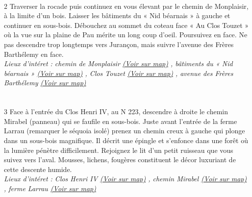 \documentclass{article}
\begin{document}
        \paragraph{}
        2
                        Traverser la rocade puis continuez en vous élevant par le chemin de Monplaisir, à la limite d'un bois. Laisser les bâtiments du « Nid béarnais » à gauche et continuer en sous-bois. Débouchez au sommet du coteau face « Au Clos Touzet » où la vue sur la plaine de Pau mérite un long coup d'oeil. Poursuivez en face. Ne pas descendre trop longtemps vers Jurançon, mais suivre l'avenue des Frères Barthélemy en face.
                    \\
        \emph{Lieux d'intéret : chemin de
                            Monplaisir 
        \href{https://www.google.com/maps/?q=43.287530, -0.391115}{(Voir sur map)}
        , bâtiments du « Nid
                            béarnais » 
        \href{https://www.google.com/maps/?q=43.287530, -0.391115}{(Voir sur map)}
        , Clos Touzet 
        \href{https://www.google.com/maps/?q=43.287530, -0.391115}{(Voir sur map)}
        , avenue des Frères
                            Barthélemy 
        \href{https://www.google.com/maps/?q=43.287530, -0.391115}{(Voir sur map)}
        }\\~\\

        \paragraph{}
        3
                        Face à l'entrée du Clos Henri IV, au N 223, descendre à droite le chemin Mirabel (panneau) qui se faufile en sous-bois. Juste avant l'entrée de la ferme Larrau (remarquer le séquoia isolé) prenez un chemin creux à gauche qui plonge dans un sous-bois magnifique. Il décrit une épingle et s'enfonce dans une forêt où la lumière pénètre difficilement. Rejoignez le lit d'un petit ruisseau que vous suivez vers l'aval. Mousses, lichens, fougères constituent le décor luxuriant de cette descente humide.
                    \\
        \emph{Lieux d'intéret : Clos Henri IV 
        \href{https://www.google.com/maps/?q=43.287530, -0.391115}{(Voir sur map)}
        , chemin
                            Mirabel 
        \href{https://www.google.com/maps/?q=43.287530, -0.391115}{(Voir sur map)}
        , ferme Larrau 
        \href{https://www.google.com/maps/?q=43.287530, -0.391115}{(Voir sur map)}
        }\\~\\
\end{document}
